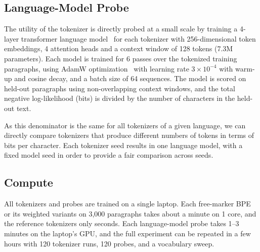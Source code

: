 \subsection{Language-Model Probe}
The utility of the tokenizer is directly probed at a small scale by training a 4-layer transformer language model~\cite{vaswani2017attention} for each tokenizer with 256-dimensional token embeddings, 4 attention heads and a context window of 128 tokens (7.3M parameters).
Each model is trained for 6 passes over the tokenized training paragraphs, using AdamW optimization~\cite{loshchilov2019adamw} with learning rate $3\times10^{-4}$ with warm-up and cosine decay, and a batch size of 64 sequences.
The model is scored on held-out paragraphs using non-overlapping context windows, and the total negative log-likelihood (bits) is divided by the number of characters in the held-out text.

As this denominator is the same for all tokenizers of a given language, we can directly compare tokenizers that produce different numbers of tokens in terms of bits per character.
Each tokenizer seed results in one language model, with a fixed model seed in order to provide a fair comparison across seeds.

\subsection{Compute}
All tokenizers and probes are trained on a single laptop.
Each free-marker BPE or its weighted variants on 3,000 paragraphs takes about a minute on 1 core, and the reference tokenizers only seconds.
Each language-model probe takes 1--3 minutes on the laptop's GPU, and the full experiment can be repeated in a few hours with 120 tokenizer runs, 120 probes, and a vocabulary sweep.
